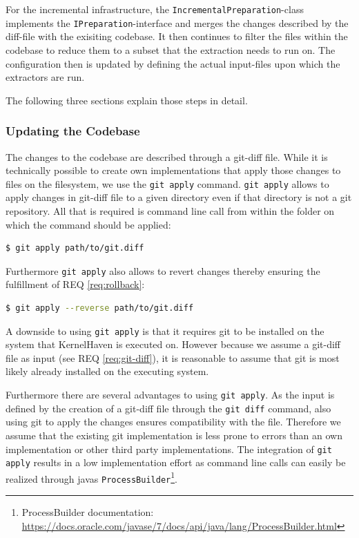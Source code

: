 \documentclass[a4paper]{article}
\begin{document}
For the incremental infrastructure, the \texttt{IncrementalPreparation}-class implements the \texttt{IPreparation}-interface and merges the changes described by the diff-file with the exisiting codebase. It then continues to filter the files within the codebase to reduce them to a subset that the extraction needs to run on. The configuration then is updated by defining the actual input-files upon which the extractors are run.

The following three sections explain those steps in detail.

\subsubsection{Updating the Codebase}\label{git-apply}

The changes to the codebase are described through a git-diff file. While it is technically possible to create own implementations that apply those changes to files on the filesystem, we use the \texttt{git apply} command. \texttt{git apply} allows to apply changes in git-diff file to a given directory even if that directory is not a git repository. All that is required is command line call from within the folder on which the command should be applied:

\begin{lstlisting}[language=bash]
  $ git apply path/to/git.diff
\end{lstlisting}

 Furthermore \texttt{git apply} also allows to revert changes thereby ensuring the fulfillment of REQ \ref{req:rollback}:
 \begin{lstlisting}[language=bash]
  $ git apply --reverse path/to/git.diff
\end{lstlisting}
 
 A downside to using \texttt{git apply} is that it requires git to be installed on the system that KernelHaven is executed on. However because we assume a git-diff file as input (see REQ \ref{req:git-diff}), it is reasonable to assume that git is most likely already installed on the executing system.

Furthermore there are several advantages to using \texttt{git apply}. As the input is defined by the creation of a git-diff file through the \texttt{git diff} command, also using git to apply the changes ensures compatibility with the file. Therefore we assume that the existing git implementation is less prone to errors than an own implementation or other third party implementations. The integration of \texttt{git apply} results in a low implementation effort as command line calls can easily be realized through javas \texttt{ProcessBuilder}\footnote{ProcessBuilder documentation: \url{https://docs.oracle.com/javase/7/docs/api/java/lang/ProcessBuilder.html}}.
\end{document}
